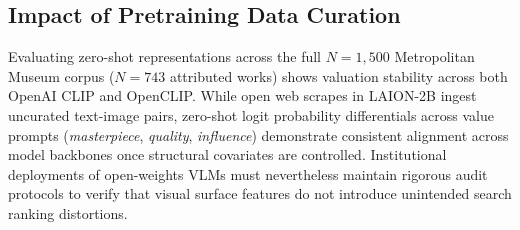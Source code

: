 \documentclass[pdflatex,sn-mathphys-num]{sn-jnl}%
\theoremstyle{thmstyleone}%
\theoremstyle{thmstyletwo}%
\theoremstyle{thmstylethree}%
\begin{document}
\subsection{Impact of Pretraining Data Curation}
Evaluating zero-shot representations across the full $N=1,500$ Metropolitan Museum corpus ($N=743$ attributed works) shows valuation stability across both OpenAI CLIP and OpenCLIP. While open web scrapes in LAION-2B ingest uncurated text-image pairs, zero-shot logit probability differentials across value prompts (\textit{masterpiece}, \textit{quality}, \textit{influence}) demonstrate consistent alignment across model backbones once structural covariates are controlled. Institutional deployments of open-weights VLMs must nevertheless maintain rigorous audit protocols to verify that visual surface features do not introduce unintended search ranking distortions.
\end{document}
